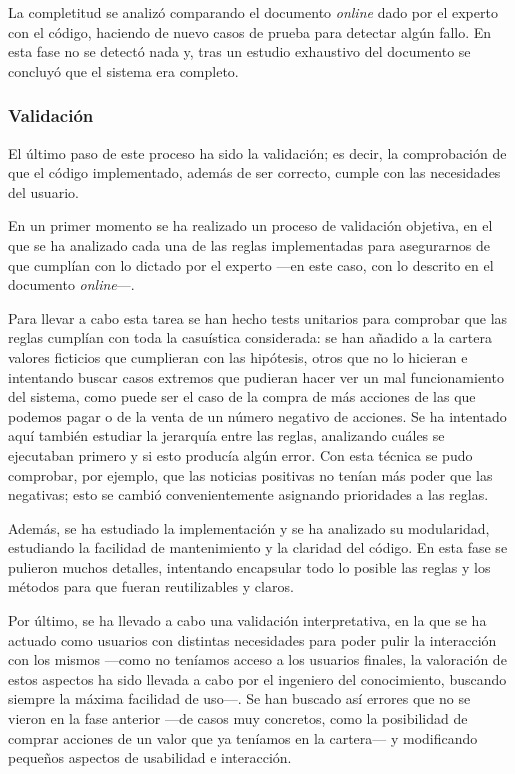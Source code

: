\documentclass[a4paper, 11pt, titlepage]{article}
\begin{document}
    La completitud se analizó comparando el documento \emph{online} dado por el experto con el código, haciendo de nuevo casos de prueba para detectar algún fallo. En esta fase no se detectó nada y, tras un estudio exhaustivo del documento se concluyó que el sistema era completo.

    \subsubsection*{Validación}
    El último paso de este proceso ha sido la validación; es decir, la comprobación de que el código implementado, además de ser correcto, cumple con las necesidades del usuario.

    En un primer momento se ha realizado un proceso de validación objetiva, en el que se ha analizado cada una de las reglas implementadas para asegurarnos de que cumplían con lo dictado por el experto ---en este caso, con lo descrito en el documento \emph{online}---.

    Para llevar a cabo esta tarea se han hecho tests unitarios para comprobar que las reglas cumplían con toda la casuística considerada: se han añadido a la cartera valores ficticios que cumplieran con las hipótesis, otros que no lo hicieran e intentando buscar casos extremos que pudieran hacer ver un mal funcionamiento del sistema, como puede ser el caso de la compra de más acciones de las que podemos pagar o de la venta de un número negativo de acciones. Se ha intentado aquí también estudiar la jerarquía entre las reglas, analizando cuáles se ejecutaban primero y si esto producía algún error. Con esta técnica se pudo comprobar, por ejemplo, que las noticias positivas no tenían más poder que las negativas; esto se cambió convenientemente asignando prioridades a las reglas.

    Además, se ha estudiado la implementación y se ha analizado su modularidad, estudiando la facilidad de mantenimiento y la claridad del código. En esta fase se pulieron muchos detalles, intentando encapsular todo lo posible las reglas y los métodos para que fueran reutilizables y claros.

    Por último, se ha llevado a cabo una validación interpretativa, en la que se ha actuado como usuarios con distintas necesidades para poder pulir la interacción con los mismos ---como no teníamos acceso a los usuarios finales, la valoración de estos aspectos ha sido llevada a cabo por el ingeniero del conocimiento, buscando siempre la máxima facilidad de uso---. Se han buscado así errores que no se vieron en la fase anterior ---de casos muy concretos, como la posibilidad de comprar acciones de un valor que ya teníamos en la cartera--- y modificando pequeños aspectos de usabilidad e interacción.
\end{document}
